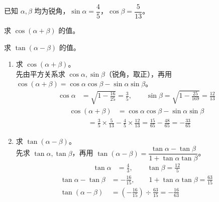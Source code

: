 \documentclass[12pt,a4paper]{exam-zh}
\begin{document}
\begin{question}[points = 8]
    已知 $\alpha,\beta$ 均为锐角，$\sin\alpha=\dfrac{4}{5}$，$\cos\beta=\dfrac{5}{13}$。
    \begin{questionparts}
        \item 求 $\cos(\alpha+\beta)$ 的值。 

        \item 求 $\tan(\alpha-\beta)$ 的值。 

    \end{questionparts}
\end{question}

\begin{solution}
    \begin{enumerate}[label=(\alph*)]
        \item 求 $\cos(\alpha+\beta)$。 \\
        先由平方关系求 $\cos\alpha,\sin\beta$（锐角，取正），再用 $\cos(\alpha+\beta)=\cos\alpha\cos\beta-\sin\alpha\sin\beta$。 \\
        \begin{align*}
            \cos\alpha &= \sqrt{1-\frac{16}{25}} = \frac{3}{5}, \qquad \sin\beta = \sqrt{1-\frac{25}{169}} = \frac{12}{13}
        \end{align*}
        \begin{align*}
            \cos(\alpha+\beta) &= \cos\alpha\cos\beta-\sin\alpha\sin\beta
        \end{align*}
        \begin{align*}
            &= \frac{3}{5}\times\frac{5}{13}-\frac{4}{5}\times\frac{12}{13} = \frac{15}{65}-\frac{48}{65} = -\frac{33}{65}
        \end{align*}

        \item 求 $\tan(\alpha-\beta)$。 \\
        先求 $\tan\alpha,\tan\beta$，再用 $\tan(\alpha-\beta)=\dfrac{\tan\alpha-\tan\beta}{1+\tan\alpha\tan\beta}$。 \\
        \begin{align*}
            \tan\alpha &= \frac{4}{3}, \qquad \tan\beta = \frac{12}{5}
        \end{align*}
        \begin{align*}
            \tan\alpha-\tan\beta &= -\frac{16}{15}, \qquad 1+\tan\alpha\tan\beta = \frac{63}{15} \\
            \tan(\alpha-\beta) &= \left(-\frac{16}{15}\right)\div\frac{63}{15} = -\frac{16}{63}
        \end{align*}


\end{enumerate}
\end{solution}
\end{document}
